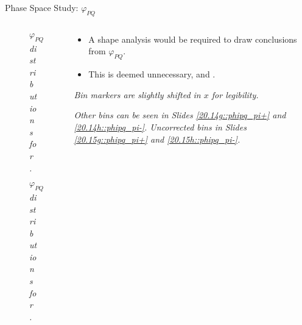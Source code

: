 \begin{frame}{Phase Space Study: $\varphi_{PQ}$}
    \label{12.16::phipq}

    \begin{columns}[onlytextwidth,T]

    \begin{column}{.44\linewidth}
        \vspace{-15pt}
        \begin{center}
            \begin{figure}[t]
                \scriptsize{\textit{$\varphi_{PQ}$ distributions for \ef{$\pi^-$}.}}
            \end{figure}

            \vspace{-9pt}
            \begin{figure}[t]
                \scriptsize{\textit{$\varphi_{PQ}$ distributions for \ef{$\pi^+$}.}}
            \end{figure}
        \end{center}
    \end{column}

    \begin{column}{.54\linewidth}
        \begin{itemize}
            \item
                A shape analysis would be required to draw conclusions from $\varphi_{PQ}$.

            \vspace{12pt}
            \item
                This is deemed unnecessary, and .
        \end{itemize}

        \vspace{119pt}

        \begin{flushright}
            \tiny{\textit{Bin markers are slightly shifted in $x$ for legibility.}}

            \tiny{\textit{
                Other bins can be seen in Slides \textcolor{efd_purple}{\ref{20.14g::phipq_pi+}} and \textcolor{efd_purple}{\ref{20.14h::phipq_pi-}}.
                Uncorrected bins in Slides \textcolor{efd_purple}{\ref{20.15g::phipq_pi+}} and \textcolor{efd_purple}{\ref{20.15h::phipq_pi-}}.
            }}
        \end{flushright}
    \end{column}

    \end{columns}
\end{frame}
